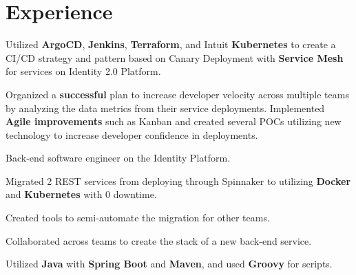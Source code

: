 \documentclass[]{deedy-resume-openfont}
\begin{document}
\begin{minipage}[t]{0.67\textwidth}


\section{Experience}
\vspace{\topsep} %
\begin{tightemize}
  \item Utilized \textbf{ArgoCD}, \textbf{Jenkins}, \textbf{Terraform}, and Intuit \textbf{Kubernetes} to create a CI/CD strategy and pattern based on Canary Deployment with \textbf{Service Mesh} for services on Identity 2.0 Platform.
  \item Organized a \textbf{successful} plan to increase developer velocity across multiple teams by analyzing the data metrics from their service deployments. Implemented \textbf{Agile improvements} such as Kanban and created several POCs utilizing new technology to increase developer confidence in deployments.
\end{tightemize}
\sectionsep

\vspace{\topsep} %
\begin{tightemize}
  \item Back-end software engineer on the Identity Platform.
  \item Migrated 2 REST services from deploying through Spinnaker to utilizing \textbf{Docker} and \textbf{Kubernetes} with 0 downtime.
  \item Created tools to semi-automate the migration for other teams.
  \item Collaborated across teams to create the stack of a new back-end service.
  \item Utilized \textbf{Java} with \textbf{Spring Boot} and \textbf{Maven}, and used \textbf{Groovy} for scripts.
\end{tightemize}
\sectionsep


\end{minipage}
\end{document}
